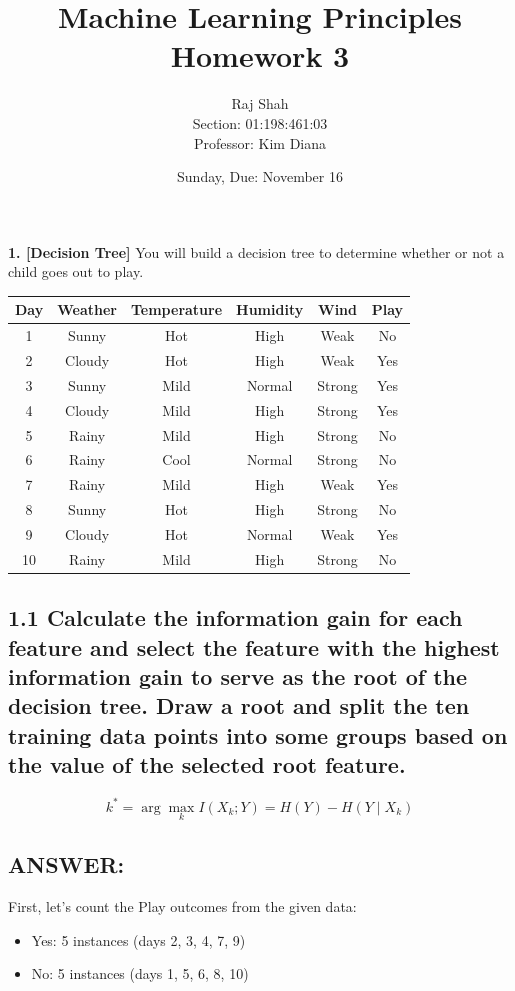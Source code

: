 \documentclass[12pt]{article}
\title{\textbf{Machine Learning Principles}\\[0.4cm]
Homework 3}
\author{Raj Shah \\ Section: 01:198:461:03 \\ Professor: Kim Diana}
\date{Sunday, Due: November 16}
\begin{document}
\maketitle

\vspace{1em}

\newpage\textbf{1. [Decision Tree]} You will build a decision tree to determine whether or not a child goes out to play.

\begin{center}
\begin{tabular}{c c c c c c}
\toprule
Day & Weather & Temperature & Humidity & Wind & Play \\
\midrule
1  & Sunny  & Hot  & High   & Weak   & No  \\
2  & Cloudy & Hot  & High   & Weak   & Yes \\
3  & Sunny  & Mild & Normal & Strong & Yes \\
4  & Cloudy & Mild & High   & Strong & Yes \\
5  & Rainy  & Mild & High   & Strong & No  \\
6  & Rainy  & Cool & Normal & Strong & No  \\
7  & Rainy  & Mild & High   & Weak   & Yes \\
8  & Sunny  & Hot  & High   & Strong & No  \\
9  & Cloudy & Hot  & Normal & Weak   & Yes \\
10 & Rainy  & Mild & High   & Strong & No  \\
\bottomrule
\end{tabular}
\end{center}

\subsection*{1.1
Calculate the information gain for each feature and select the feature with the highest information gain to serve as the root of the decision tree. Draw a root and split the ten training data points into some groups based on the value of the selected root feature.}

\[
k^* = \arg\max_k I(X_k; Y) = H(Y) - H(Y \mid X_k)
\]
\subsection*{ANSWER:}
First, let's count the Play outcomes from the given data:
\begin{itemize}
    \item Yes: 5 instances (days 2, 3, 4, 7, 9)
    \item No: 5 instances (days 1, 5, 6, 8, 10)
\end{itemize}
\end{document}
